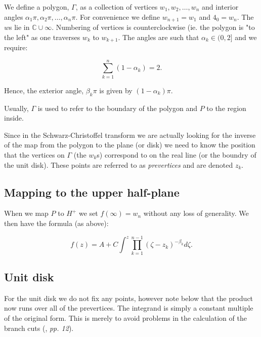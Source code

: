 \documentclass[a4paper,10pt]{amsart}
\newcommand{\sch}{Schwarz-Christoffel }
\begin{document}
\begin{defn}[Polygon]
We define a polygon, $\Gamma$, as a collection of vertices $w_1, w_2,\dots,w_n$ and interior angles $\alpha_1\pi, \alpha_2\pi, \dots, \alpha_n\pi$. For convenience we define $w_{n+1} = w_1$ and $4_0=w_n$. The $w$s lie in $\mathbb{C} \cup {\infty}$. Numbering of vertices is counterclockwise (ie. the polygon is "to the left" as one traverses $w_k$ to $w_{k+1}$. The angles are such that $\alpha_k \in (0,2]$ and we require:

\begin{equation}
\sum_{k=1}^n (1-\alpha_k) = 2.
\end{equation}

Hence, the exterior angle, $\beta_k\pi$ is given by $(1-\alpha_k)\pi$.

Usually, $\Gamma$ is used to refer to the boundary of the polygon and $P$ to the region inside.

\end{defn}

Since in the \sch transform we are actually looking for the inverse of the map from the polygon to the plane (or disk) we need to know the position that the vertices on $\Gamma$ (the $w_k$s) correspond to on the real line (or the boundry of the unit disk). These points are referred to as \emph{prevertices} and are denoted $z_k$.






\subsection{Mapping to the upper half-plane}

When we map $P$ to $H^+$ we set $f(\infty) = w_n$ without any loss of generality. We then have the formula (as above):

\begin{equation}
f(z) = A + C \int^z \prod_{k=1}^{n-1} (\zeta-z_k)^{-\beta_k} d\zeta.
\end{equation}




\subsection{Unit disk}

For the unit disk we do not fix any points, however note below that the product now runs over all of the prevertices. The integrand is simply a constant multiple of the original form. This is merely to avoid problems in the calculation of the branch cuts (\cite{driscoll}, \emph{pp. 12}).
\end{document}
